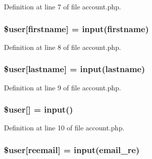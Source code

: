 Definition at line 7 of file account.\+php.

\subsubsection[{\texorpdfstring{\$user}{$user}}]{\setlength{\rightskip}{0pt plus 5cm}\${\bf user}\mbox{[}\textquotesingle{}firstname\textquotesingle{}\mbox{]} = {\bf input}(\textquotesingle{}firstname\textquotesingle{})}\hypertarget{actions_2account_8php_a3c8ba9ea696968574370c51a90ff638c}{}\label{actions_2account_8php_a3c8ba9ea696968574370c51a90ff638c}


Definition at line 8 of file account.\+php.

\subsubsection[{\texorpdfstring{\$user}{$user}}]{\setlength{\rightskip}{0pt plus 5cm}\${\bf user}\mbox{[}\textquotesingle{}lastname\textquotesingle{}\mbox{]} = {\bf input}(\textquotesingle{}lastname\textquotesingle{})}\hypertarget{actions_2account_8php_a1187774c6d9942181216e0839e5e73bc}{}\label{actions_2account_8php_a1187774c6d9942181216e0839e5e73bc}


Definition at line 9 of file account.\+php.

\subsubsection[{\texorpdfstring{\$user}{$user}}]{\setlength{\rightskip}{0pt plus 5cm}\${\bf user}\mbox{[}\textquotesingle{}\mbox{]} = {\bf input}(\textquotesingle{})}\hypertarget{actions_2account_8php_ae9de5cc5ae3fec81bb110d3a77ad7eec}{}\label{actions_2account_8php_ae9de5cc5ae3fec81bb110d3a77ad7eec}


Definition at line 10 of file account.\+php.

\subsubsection[{\texorpdfstring{\$user}{$user}}]{\setlength{\rightskip}{0pt plus 5cm}\${\bf user}\mbox{[}\textquotesingle{}reemail\textquotesingle{}\mbox{]} = {\bf input}(\textquotesingle{}email\+\_\+re\textquotesingle{})}\hypertarget{actions_2account_8php_a51e0459c93e600b4959a74463028a5e1}{}\label{actions_2account_8php_a51e0459c93e600b4959a74463028a5e1}


